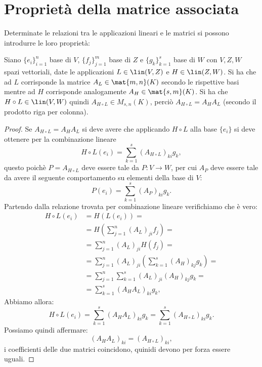 \section{Proprietà della matrice associata}
Determinate le relazioni tra le applicazioni lineari e le matrici si possono introdurre le loro proprietà:
\begin{teorema} \label{d:composizione-applicazioni}
	Siano $\{e_i\}_{i=1}^n$ base di $V$, $\{f_j\}_{j=1}^m$ base di $Z$ e $\{g_k\}_{k=1}^s$ base di $W$ con $V,Z,W$ spazi vettoriali, date le applicazioni $L\in \lin(V,Z)$ e $H\in \lin(Z,W)$.
	Si ha che ad $L$ corrisponde la matrice $A_L\in \mat{m,n}(K)$ secondo le rispettive basi mentre ad $H$ corrisponde analogamente $A_H\in \mat{s,m}(K)$.
	Si ha che $H\circ L\in \lin(V,W)$ quindi $A_{H\circ L}\in M_{s,n}(K)$, perciò $A_{H\circ L} = A_H A_L$ (secondo il prodotto riga per colonna).
\end{teorema}
\begin{proof}
	Se $A_{H\circ L} = A_H A_L$ si deve avere che applicando $H\circ L$ alla base $\{e_i\}$ si deve ottenere per la combinazione lineare
	\begin{equation*}
		H\circ L (e_i) = \sum_{k=1}^s(A_{H\circ L})_{ki} g_{k},
	\end{equation*}
	questo poichè $P=A_{H\circ L}$ deve essere tale da $P\colon V\to W$, per cui $A_P$ deve essere tale da avere il seguente comportamento su elementi della base di $V$:
	\begin{equation*}
		P(e_i)=  \sum_{k=1}^s(A_{P})_{ki} g_{k}.
	\end{equation*}
	Partendo dalla relazione trovata per combinazione lineare verifichiamo che è vero:
	\begin{equation*}
		\begin{split}
			H\circ L (e_i) &= H (L(e_i)) =\\
			&= H(\sum_{j=1}^n(A_{L})_{ji} f_{j}) =\\ 
			&= \sum_{j=1}^n(A_{L})_{ji} H(f_{j}) =\\ 
			&= \sum_{j=1}^n(A_{L})_{ji}( \sum_{k=1}^s(A_{H})_{kj} g_{k}) =\\ 
			&= \sum_{j=1}^n \sum_{k=1}^s(A_{L})_{ji}(A_{H})_{kj} g_{k} =\\
			&=  \sum_{k=1}^s(A_{H} A_L)_{ki} g_{k},
		\end{split}
	\end{equation*}
	Abbiamo allora:
	\begin{equation*}
		H\circ L (e_i) = \sum_{k=1}^s(A_{H} A_L)_{ki} g_{k} = \sum_{k=1}^s(A_{H\circ L})_{ki} g_{k}.
	\end{equation*}
	Possiamo quindi affermare:
	\begin{equation*}
		(A_{H} A_L)_{ki} = (A_{H\circ L})_{ki},
	\end{equation*}
	i coefficienti delle due matrici coincidono, quinidi devono per forza essere uguali.
\end{proof}
